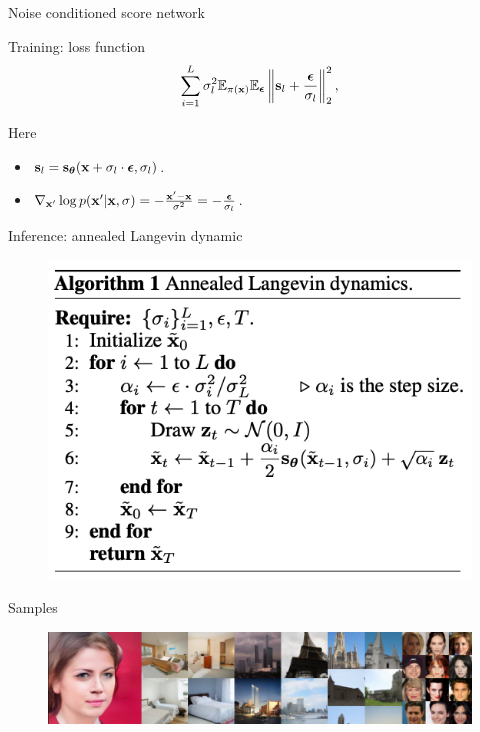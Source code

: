\begin{frame}{Noise conditioned score network}
	\begin{minipage}{0.5\linewidth}
		\vspace{-0.7cm}
		\begin{block}{Training: loss function}
			\vspace{-0.8cm}
			\[
			\sum_{i=1}^L \sigma_l^2\mathbb{E}_{\pi(\mathbf{x})} \mathbb{E}_{\boldsymbol{\epsilon}}\left\| \mathbf{s}_l + \frac{\boldsymbol{\epsilon}}{\sigma_l} \right\|^2_2,
			\]
		\end{block}
		\vspace{-0.5cm}
		Here
		\begin{itemize}
			\item $\mathbf{s}_l = \mathbf{s}_{\boldsymbol{\theta}}(\mathbf{x} + \sigma_l \cdot \boldsymbol{\epsilon}, \sigma_l)$.
			\item $\nabla_{\mathbf{x}'} \log p(\mathbf{x}' | \mathbf{x}, \sigma) = - \frac{\mathbf{x}' - \mathbf{x}}{\sigma^2} = - \frac{\boldsymbol{\epsilon}}{\sigma_l}$.
		\end{itemize}
	\end{minipage}%
	\begin{minipage}{0.5\linewidth}
		\begin{block}{Inference: annealed Langevin dynamic}
			\begin{figure}
				\includegraphics[width=0.9\linewidth]{figs/ald}
			\end{figure}
		\end{block}
	\end{minipage}
	\vspace{-0.7cm}
	\begin{block}{Samples}
		\begin{figure}
			\includegraphics[width=\linewidth]{figs/NCSNv2}
		\end{figure}
	\end{block}
\end{frame}
